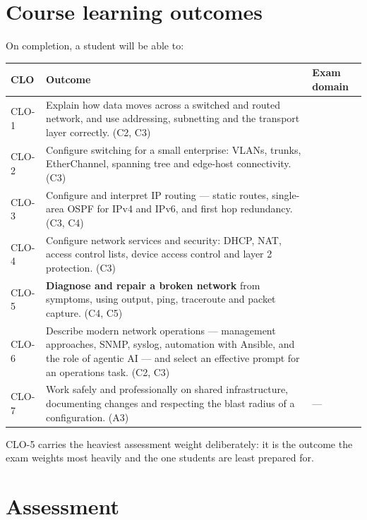 \section*{Course learning outcomes}

On completion, a student will be able to:

\begin{longtable}{@{}L{1.3cm}L{10.6cm}L{3.4cm}@{}}
\toprule
{}
\textbf{CLO} & \textbf{Outcome} & \textbf{Exam domain} \\
\midrule
\endhead
CLO-1 & Explain how data moves across a switched and routed network, and use
addressing, subnetting and the transport layer correctly. (C2, C3) &
  \\
CLO-2 & Configure switching for a small enterprise: VLANs, trunks,
EtherChannel, spanning tree and edge-host connectivity. (C3) &
   \\
CLO-3 & Configure and interpret IP routing --- static routes, single-area OSPF
for IPv4 and IPv6, and first hop redundancy. (C3, C4) &
    \\
CLO-4 & Configure network services and security: DHCP, NAT, access control
lists, device access control and layer 2 protection. (C3) &
    \\
CLO-5 & \textbf{Diagnose and repair a broken network} from symptoms, using
 output, ping, traceroute and packet capture. (C4, C5) &
   \\
CLO-6 & Describe modern network operations --- management approaches, SNMP,
syslog, automation with Ansible, and the role of agentic AI --- and select an
effective prompt for an operations task. (C2, C3) &
      \\
CLO-7 & Work safely and professionally on shared infrastructure, documenting
changes and respecting the blast radius of a configuration. (A3) & --- \\
\bottomrule
\end{longtable}

CLO-5 carries the heaviest assessment weight deliberately: it is the outcome the
exam weights most heavily and the one students are least prepared for.

\section*{Assessment}

